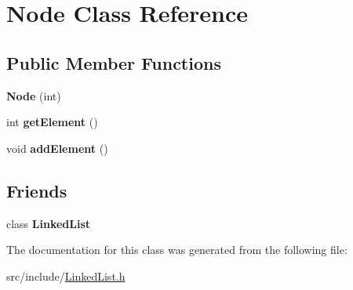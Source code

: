 \hypertarget{classNode}{}\section{Node Class Reference}
\label{classNode}
\subsection*{Public Member Functions}
\begin{DoxyCompactItemize}
\item 
\mbox{\label{classNode_aff71d952af8363f046a67a8b12194e46}} 
{\bfseries Node} (int)
\item 
\mbox{\label{classNode_a1aea373d6fd00e0a596c0d48d3c043e2}} 
int {\bfseries get\+Element} ()
\item 
\mbox{\label{classNode_abd67bd710c59236e813a7e22d11290cc}} 
void {\bfseries add\+Element} ()
\end{DoxyCompactItemize}
\subsection*{Friends}
\begin{DoxyCompactItemize}
\item 
\mbox{\label{classNode_af71fad9f4990e232af55c73aeddb3823}} 
class {\bfseries Linked\+List}
\end{DoxyCompactItemize}


The documentation for this class was generated from the following file\+:\begin{DoxyCompactItemize}
\item 
src/include/\hyperlink{LinkedList_8h}{Linked\+List.\+h}\end{DoxyCompactItemize}
